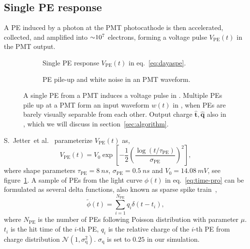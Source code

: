 \subsection{Single PE response}
\label{subsec:spe}

A PE induced by a photon at the PMT photocathode is then accelerated, collected, and amplified into $\num[retain-unity-mantissa=false]{\sim 1e7}$ electrons, forming a voltage pulse $V_\mathrm{PE}(t)$ in the PMT output.
\begin{figure}[H]
  \begin{subfigure}{.49\textwidth}
    \centering
    \resizebox{\textwidth}{!}{}
    \caption{\label{fig:spe} Single PE response $V_\mathrm{PE}(t)$ in eq.~\eqref{eq:dayaspe}.}
  \end{subfigure}
  \begin{subfigure}{.49\textwidth}
    \centering
    \resizebox{\textwidth}{!}{}
    \caption{\label{fig:pile} PE pile-up and white noise in an PMT waveform.}
  \end{subfigure}
  \caption{A single PE from a PMT induces a voltage pulse in . Multiple PEs pile up at a PMT form an input waveform $w(t)$ in , when PEs are barely visually separable from each other. Output charge $\hat{\bm{t}}, \hat{\bm{q}}$ also in , which we will discuss in section~\ref{sec:algorithm}. }
\end{figure}

S.~Jetter~et al.~\cite{jetter_pmt_2012} parameterize $V_\mathrm{PE}(t)$ as,
\begin{equation}
  V_\mathrm{PE}(t) = V_{0}\exp\left[-\frac{1}{2}\left(\frac{\log(t/\tau_\mathrm{PE})}{\sigma_\mathrm{PE}}\right)^{2}\right],
  \label{eq:dayaspe}
\end{equation}
where shape parameters $\tau_\mathrm{PE}=\SI{8}{ns}$, $\sigma_\mathrm{PE}=\SI{0.5}{ns}$ and $V_{0}=\SI{14.08}{mV}$, see figure~\ref{fig:spe}.  A sample of PEs from the light curve $\phi(t)$ in eq.~\eqref{eq:time-pro} can be formulated as several delta functions, also known as sparse spike train~\cite{levy_reconstruction_1981}, 
\begin{equation}
  \label{eq:lc-sample}
  \tilde{\phi}(t) = \sum_{i=1}^{N_{\mathrm{PE}}} q_i \delta(t-t_i),
\end{equation}
where $N_\mathrm{PE}$ is the number of PEs following Poisson distribution with parameter $\mu$.  $t_i$ is the hit time of the $i$-th PE, $q_i$ is the relative charge of the $i$-th PE from charge distribution $\mathcal{N}(1,\sigma_\mathrm{q}^2)$.  $\sigma_\mathrm{q}$ is set to $0.25$ in our simulation.

